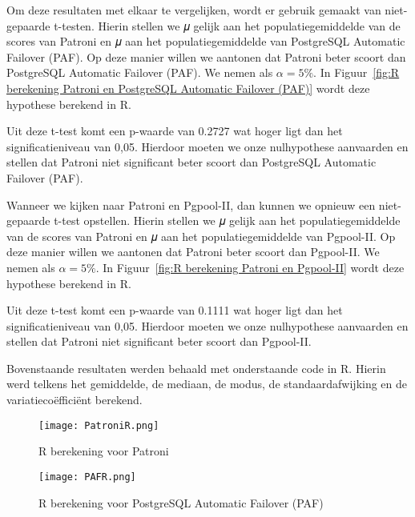 Om deze resultaten met elkaar te vergelijken, wordt er gebruik gemaakt van niet-gepaarde t-testen. Hierin stellen we 𝜇 gelijk aan het populatiegemiddelde van de scores van Patroni en 𝜇 aan het populatiegemiddelde van PostgreSQL Automatic Failover (PAF). Op deze manier willen we aantonen dat Patroni beter scoort dan PostgreSQL Automatic Failover (PAF). We nemen als $\alpha = 5\%$. In Figuur~\ref{fig:R berekening Patroni en PostgreSQL Automatic Failover (PAF)} wordt deze hypothese berekend in R.

Uit deze t-test komt een p-waarde van 0.2727 wat hoger ligt dan het significatieniveau van 0,05. Hierdoor moeten we onze nulhypothese aanvaarden en stellen dat Patroni niet significant beter scoort dan PostgreSQL Automatic Failover (PAF). 

Wanneer we kijken naar Patroni en Pgpool-II, dan kunnen we opnieuw een niet-gepaarde t-test opstellen. Hierin stellen we 𝜇 gelijk aan het populatiegemiddelde van de scores van Patroni en 𝜇 aan het populatiegemiddelde van Pgpool-II. Op deze manier willen we aantonen dat Patroni beter scoort dan Pgpool-II. We nemen als $\alpha = 5\%$. In Figuur~\ref{fig:R berekening Patroni en Pgpool-II} wordt deze hypothese berekend in R.

Uit deze t-test komt een p-waarde van 0.1111 wat hoger ligt dan het significatieniveau van 0,05. Hierdoor moeten we onze nulhypothese aanvaarden en stellen dat Patroni niet significant beter scoort dan Pgpool-II.







Bovenstaande resultaten werden behaald met onderstaande code in R. Hierin werd telkens het gemiddelde, de mediaan, de modus, de standaardafwijking en de variatiecoëfficiënt berekend.

\begin{figure}[!h]
    \centering
    \texttt{[image: PatroniR.png]}
    \caption{R berekening voor Patroni}
    \label{fig:R berekening voor Patroni}
\end{figure}

\begin{figure}[!h]
    \centering
    \texttt{[image: PAFR.png]}
    \caption{R berekening voor PostgreSQL Automatic Failover (PAF)}
    \label{fig:R berekening voor PostgreSQL Automatic Failover (PAF)}
\end{figure}

